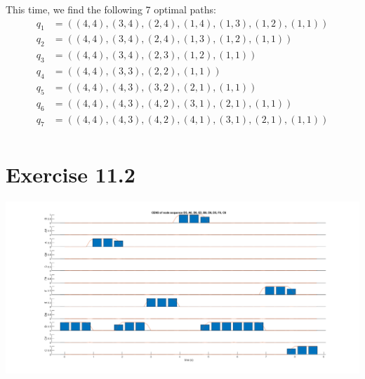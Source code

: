 \documentclass[12pt]{article}
\begin{document}
\begin{itemize}
\[    \]
    This time, we find the following 7 optimal paths:
    \begin{align*}
        q_1 &= ((4,4),(3,4),(2,4),(1,4),(1,3),(1,2),(1,1)) \\
        q_2 &= ((4,4),(3,4),(2,4),(1,3),(1,2),(1,1)) \\
        q_3 &= ((4,4),(3,4),(2,3),(1,2),(1,1)) \\
        q_4 &= ((4,4),(3,3),(2,2),(1,1)) \\
        q_5 &= ((4,4),(4,3),(3,2),(2,1),(1,1)) \\
        q_6 &= ((4,4),(4,3),(4,2),(3,1),(2,1),(1,1)) \\
        q_7 &= ((4,4),(4,3),(4,2),(4,1),(3,1),(2,1),(1,1)) \\
    \end{align*}
\end{itemize}

\section*{Exercise 11.2}

\begin{center}
    \includegraphics[width=\textwidth]{cens}
\end{center}
\end{document}
